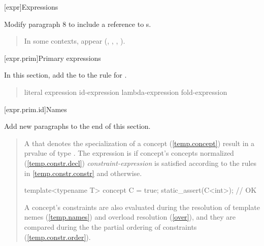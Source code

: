 

\setcounter{chapter}{7}
[expr]{Expressions}

Modify paragraph 8 to include a reference to s.

\begin{quote}
\pnum
In some contexts,  appear
(\added{\ref{expr.prim.req}, }, , 
, ).
\end{quote}

[expr.prim]{Primary expressions}

In this section, add the
 to the rule for 
.

\begin{quote}
\begin{bnf}
\br
    literal\br
    \br
    \terminal{(} expression \terminal{)}\br
    id-expression\br
    lambda-expression\br
    fold-expression\br
\end{bnf}
\end{quote}

\setcounter{subsection}{3}
[expr.prim.id]{Names}

Add new paragraphs to the end of this 
section.

\setcounter{Paras}{2}

\begin{quote}
\begin{addedblock}
\pnum
A  that denotes the specialization of a concept
(\ref{temp.concept}) result in a prvalue of type . 
%
The expression is  if concept's concepts normalized 
(\ref{temp.constr.decl}) \emph{constraint-expression} is satisfied according
to the rules in \ref{temp.constr.constr} and  otherwise.
\enterexample
\begin{codeblock}
template<typename T> concept C = true;
static_assert(C<int>); // OK
\end{codeblock}
\exitexample
\enternote
A concept's constraints are also evaluated during the resolution of template
nemes (\ref{temp.names}) and overload resolution (\ref{over}), and they are
compared during the the partial ordering of constraints 
(\ref{temp.constr.order}).
\exitnote

\end{addedblock}
\end{quote}

